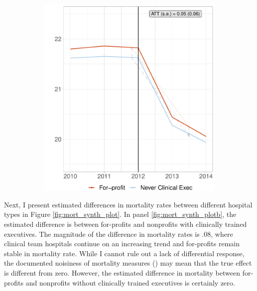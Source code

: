 \documentclass[12pt]{article}
\begin{document}
\begin{figure}[ht!]
\begin{subfigure}[b]{0.45\textwidth}
         \includegraphics[width=\textwidth]{Objects/fp_read_nomd_synth_graph.pdf}
         \label{fig:read_synth_plotc}
     \end{subfigure}
        \label{fig:read_synth_plot}
    \end{figure}

    

    Next, I present estimated differences in mortality rates between different hospital types in Figure \ref{fig:mort_synth_plot}. In panel \ref{fig:mort_synth_plotb}, the estimated difference is between for-profits and nonprofits with clinically trained executives. The magnitude of the difference in mortality rates is .08, where clinical team hospitals continue on an increasing trend and for-profits remain stable in mortality rate. While I cannot rule out a lack of differential response, the documented noisiness of mortality measures (\cite{mackenzie2016measuring}) may mean that the true effect is different from zero. However, the estimated difference in mortality between for-profits and nonprofits without clinically trained executives is certainly zero. 
\end{document}
